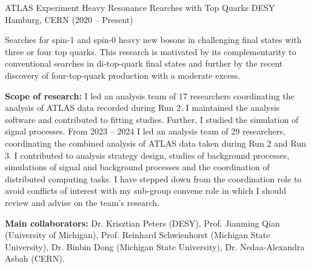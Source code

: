 



\begin{cventries}
  \cventry
    {ATLAS Experiment} %
    {Heavy Resonance Rearches with Top Quarks} %
    {DESY Hamburg, CERN} %
    {(2020 – Present)} %
    {
      \begin{cvitems} %
        \item {Searches for spin-1 and spin-0 heavy new bosons in challenging final states with three or four top quarks. This research is motivated by its complementarity to conventional searches in di-top-quark final states and further by the recent discovery of four-top-quark production with a moderate excess.}
        \item \textbf{Scope of research:} I led an analysis team of 17 researchers coordinating the analysis of
        ATLAS data recorded during Run 2. I maintained the analysis software and contributed to fitting studies. Further, I studied the simulation of signal processes. From 2023 – 2024 I led
        an analysis team of 29 researchers, coordinating the combined analysis of ATLAS data taken
        during Run 2 and Run 3. I contributed to analysis strategy design, studies of background
        processes, simulations of signal and background processes and the coordination of distributed
        computing tasks. I have stepped down from the coordination role to avoid conflicts of interest
        with my sub-group convene role in which I should review and advise on the team's research.
        \item \textbf{Main collaborators:} Dr. Krisztian Peters (DESY), Prof. Jianming Qian (University of Michigan), Prof. Reinhard Schwienhorst (Michigan State University), Dr. Binbin Dong (Michigan State University), Dr. Nedaa-Alexandra Asbah (CERN).
      \end{cvitems}
    }


\end{cventries}

